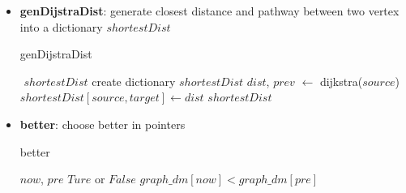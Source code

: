 \documentclass[conference,compsoc]{IEEEtran}
\renewcommand{\algorithmicrequire}{\textbf{Input:}}
\renewcommand{\algorithmicensure}{\textbf{Output:}}
\begin{document}
\begin{itemize}
  \item \textbf{genDijstraDist}: generate closest distance and pathway between
  two vertex into a dictionary $shortestDist$
    \begin{algorithm}[H]
     \caption{genDijstraDist}
     \begin{algorithmic}[3]
     \renewcommand{\algorithmicrequire}{\textbf{Input:}}
     \renewcommand{\algorithmicensure}{\textbf{Output:}}
     \REQUIRE $ $
     \ENSURE  $shortestDist$
     \STATE create dictionary $shortestDist$
       \STATE $dist$, $prev$ $\leftarrow$ dijkstra($source$) 
         \STATE $shortestDist[source, target] \leftarrow dist$
       \ENDFOR
     \ENDFOR
     \RETURN $shortestDist$
     \end{algorithmic}
     \end{algorithm}
 
   \item \textbf{better}: choose better in pointers 
     \begin{algorithm}[H]
     \caption{better}
     \begin{algorithmic}[4]
     \renewcommand{\algorithmicrequire}{\textbf{Input:}}
     \renewcommand{\algorithmicensure}{\textbf{Output:}}
     \REQUIRE $now$, $pre$
     \ENSURE  $Ture$ or $False$
     \RETURN $graph\_dm[now] < graph\_dm[pre]$
     \end{algorithmic}
     \end{algorithm}
 

\end{itemize}
\end{document}
